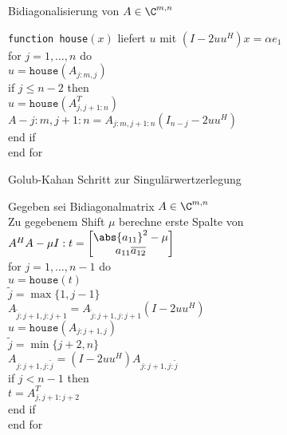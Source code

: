 \begin{karte}{Bidiagonalisierung von \(A\in \C^{m,n}\)}
    \begin{tabbing}
        { \texttt{function house}\((x)\) liefert \(u\) mit \((I - 2 u u^H)x = \alpha e_1\)} \\
        for \= \( j = 1,\ldots,n \) do \\
        \> \(u = \texttt{house}(A_{j:m, j})\) \\
        \> if \= \(j \leq n-2\) then \\
        \> \> \(u = \texttt{house}(A_{j,j+1:n}^T)\) \\
        \> \> \( A-{j:m, j+1:n} = A_{j:m,j+1:n}(I_{n-j} - 2 u u^H) \) \\
        \> end if \\
        end for
    \end{tabbing}
\end{karte}

\begin{karte}{Golub-Kahan Schritt zur Singulärwertzerlegung}
    \begin{tabbing}
        Gegeben sei Bidiagonalmatrix \(A \in \C^{m,n}\) \\
        Zu gegebenem Shift \(\mu\) berechne erste Spalte von \(A^H A - \mu I: t = \left[ \begin{matrix}
            \abs{a_{11}}^2 - \mu \\ a_{11} \overline{a_{12}}
        \end{matrix} \right]\) \\
        for \= \( j = 1 ,\ldots,n-1 \) do \\
        \> \(u = \texttt{house}(t)\) \\
        \> \( \tilde{j} = \max\{1, j-1\} \) \\
        \> \( A_{\tilde{j}:j+1, j:j+1} = A_{\tilde{j}:j+1, j:j+1}(I - 2 u u^H) \) \\
        \> \( u = \texttt{house}(A_{j:j+1, j}) \) \\
        \> \( \tilde{j} = \min\{j+2, n\} \) \\
        \> \( A_{j:j+1, j:\tilde{j}} = (I - 2 u u^H) A_{j:j+1, j:\tilde{j}} \) \\
        \> if \=\(j < n-1\) then \\
        \> \> \( t = A_{j,j+1:j+2}^T \) \\
        \> end if \\
        end for
    \end{tabbing}
\end{karte}

